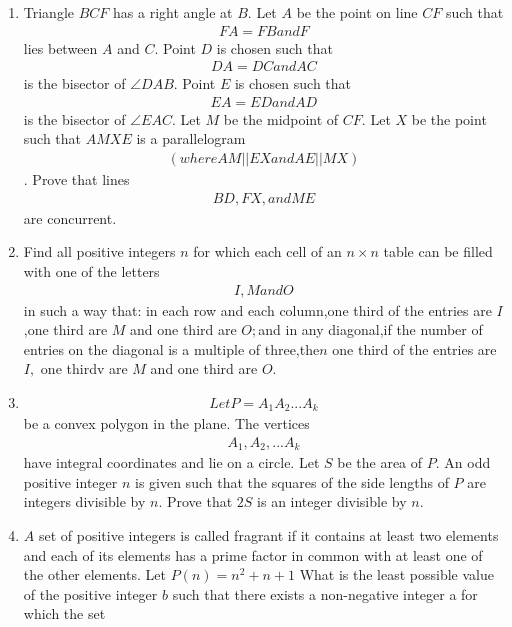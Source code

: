 \documentclass[12pt,-letter paper]{article}
\begin{document}
\begin{enumerate}
	\item Triangle $BCF$ has a right angle at $B$. Let $A$ be the point on line $CF$ such that \begin{align}FA=FB and F\end{align} lies between $A$ and $C$. Point $D$ is chosen such that \begin{align}DA = DC and AC\end{align} is the bisector of $\angle DAB.$ Point $E$ is chosen such that \begin{align}EA= ED and AD\end{align} is the bisector of $\angle EAC$. Let $M$ be the midpoint of $CF$. Let $X$ be the point such that $AMXE$ is a parallelogram \begin{align}(where AM || EX and AE || MX)\end{align}. Prove that lines \begin{align}BD, FX, and ME\end{align} are concurrent.
		\item Find all positive integers $n$ for which each cell of an $n\times n$ table can be filled with one of the letters \begin{align}I, M and O\end{align} in such a way that:
 in each row and each column,one third of the entries are $I$,one third are $M$ and one third are $O;$and
		in any diagonal,if the number of entries on the diagonal is a multiple of three,the$n$ one third of the entries are $I,$ one thirdv are $M$ and one third are $O.$
			\item \begin{align}Let P=A_1A_2... A_k\end{align} be a convex polygon in the plane. The vertices \begin{align}A_1, A_2,... A_k\end{align} have integral coordinates and lie on a circle. Let $S$ be the area of $P$. An odd positive integer $n$ is given such that the squares of the side lengths of $P$ are integers divisible by $n$. Prove that $2S$ is an integer divisible by $n$.
\item $A$ set of positive integers is called fragrant if it contains at least two elements and each of its elements has a prime factor in common with at least one of the other elements. Let $P(n) = n ^ 2 + n + 1$ What is the least possible value of the positive integer $b$ such that there exists a non-negative integer a for which the set


\end{enumerate}
\end{document}
